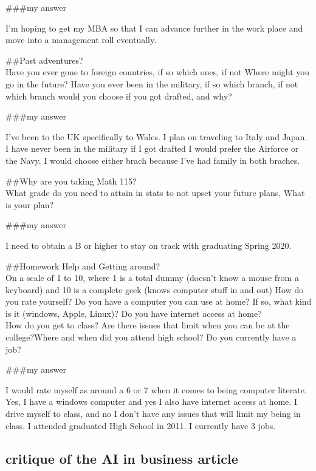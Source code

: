 \documentclass[]{article}
\begin{document}
\#\#\#my answer

I'm hoping to get my MBA so that I can advance further in the work place
and move into a management roll eventually.

\#\#Past adventures?\\
Have you ever gone to foreign countries, if so which ones, if not Where
might you go in the future? Have you ever been in the military, if so
which branch, if not which branch would you choose if you got drafted,
and why?

\#\#\#my answer

I've been to the UK specifically to Wales. I plan on traveling to Italy
and Japan. I have never been in the military if I got drafted I would
prefer the Airforce or the Navy. I would choose either brach because
I've had family in both braches.

\#\#Why are you taking Math 115?\\
What grade do you need to attain in stats to not upset your future
plans, What is your plan?

\#\#\#my answer

I need to obtain a B or higher to stay on track with graduating Spring
2020.

\#\#Homework Help and Getting around?\\
On a scale of 1 to 10, where 1 is a total dummy (doesn't know a mouse
from a keyboard) and 10 is a complete geek (knows computer stuff in and
out) How do you rate yourself? Do you have a computer you can use at
home? If so, what kind is it (windows, Apple, Linux)? Do you have
internet access at home?\\
How do you get to class? Are there issues that limit when you can be at
the college?Where and when did you attend high school? Do you currently
have a job?

\#\#\#my answer

I would rate myself as around a 6 or 7 when it comes to being computer
literate. Yes, I have a windows computer and yes I also have internet
access at home. I drive myself to class, and no I don't have any issues
that will limit my being in class. I attended graduated High School in
2011. I currently have 3 jobs.

\hypertarget{critique-of-the-ai-in-business-article}{%
\subsection{critique of the AI in business
article}\label{critique-of-the-ai-in-business-article}}
\end{document}
